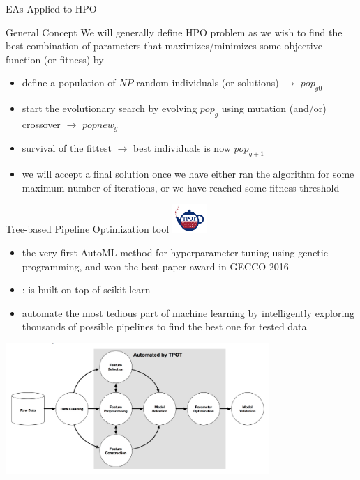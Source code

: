 \begin{frame}{EAs Applied to HPO}
\begin{block}{General Concept}
We will generally define HPO problem as we wish to find the best combination of parameters that maximizes/minimizes some objective function (or fitness) by
\begin{itemize}
    \item define a population of $NP$ random individuals (or solutions) $\rightarrow$ $pop_{g0}$
    \item start the evolutionary search by evolving $pop_g$ using mutation (and/or) crossover $\rightarrow$ $popnew_g$
    \item survival of the fittest $\rightarrow$ best individuals is now $pop_{g+1}$  
    \item we will accept a final solution once we have either ran the algorithm for some maximum number of iterations, or we have reached some fitness threshold
\end{itemize}
\end{block}
\end{frame}

\begin{frame}{Tree-based Pipeline Optimization tool 
\includegraphics[width=0.1\textwidth]{new_images/TPOT.png}}
\begin{itemize}
    \item the very first AutoML method for hyperparameter tuning using genetic programming, and won the best paper award in GECCO 2016 
    \item {}: is built on top of scikit-learn
    \item automate the most tedious part of machine learning by intelligently exploring thousands of possible pipelines to find the best one for tested data 
\end{itemize}
\centering
\includegraphics[width=0.75\textwidth]{new_images/tpot3.png}\\
\end{frame}

